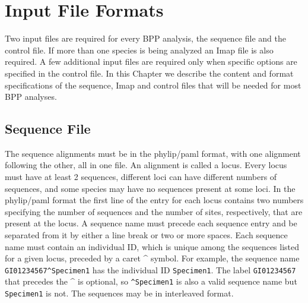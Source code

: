 \documentclass[a4paper]{book}
\numberwithin{equation}{section} \renewcommand{\baselinestretch}{0.55}
\begin{document}
\chapter{Input File Formats} \label{files} Two input files are
required for every BPP analysis, the sequence file and the control
file. If more than one species is being analyzed an Imap file is
also required. A few additional input files are required only when
specific options are specified in the control file. In this
Chapter we describe the content and format specifications of the
sequence, Imap and control files that will be needed for most BPP
analyses.

\section{Sequence File} \label{seqfile} The sequence alignments
must be in the phylip/paml format, with one alignment following
the other, all in one file. An alignment is called a locus.  Every
locus must have at least 2 sequences, different loci can have
different numbers of sequences, and some species may have no
sequences present at some loci.  In the phylip/paml format the
first line of the entry for each locus contains two numbers
specifying the number of sequences and the number of sites,
respectively, that are present at the locus.  A sequence name must
precede each sequence entry and be separated from it by either a
line break or two or more spaces.  Each sequence name must contain
an individual ID, which is unique among the sequences listed for a
given locus, preceded by a caret \^{} symbol.  For example, the
sequence name \texttt{GI01234567\^{}Specimen1} has the individual
ID \texttt{Specimen1}.  The label \texttt{GI01234567} that
precedes the \^{} is optional, so \texttt{\^{}Specimen1} is also a
valid sequence name but \texttt{Specimen1} is not.  The sequences
may be in interleaved format.
\end{document}
